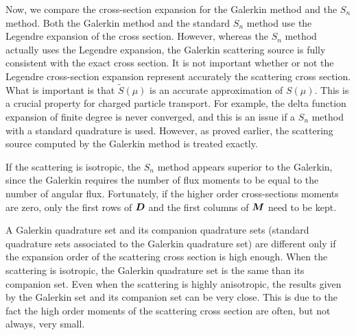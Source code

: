 Now, we compare the cross-section expansion for the Galerkin method and
the $S_n$ method. Both the Galerkin method and the standard $S_n$ method use
the Legendre expansion of the cross section. However, whereas the $S_n$ method
actually uses the Legendre expansion, the Galerkin scattering source is
fully consistent with the exact cross section. It is not
important whether or not the Legendre cross-section expansion represent
accurately the scattering cross section. What is important is that
$\tilde{S}(\mu)$ is an accurate approximation of $S(\mu)$. This is a crucial 
property for charged particle transport. For example, the delta
function expansion of finite degree is never converged, and this is an issue if a 
$S_n$ method with a standard quadrature is used. However, as proved earlier, 
the scattering source computed by the Galerkin method is treated exactly.

If the scattering is isotropic, the $S_n$ method appears superior to the
Galerkin, since the Galerkin requires the number of flux moments to be equal
to the number of angular flux. Fortunately, if the higher order cross-sections
moments are zero, only the first rows of $\boldsymbol{D}$ and the first columns of
$\boldsymbol{M}$ need to be kept.

A Galerkin quadrature set and its companion quadrature sets (standard
quadrature sets associated to the Galerkin quadrature set) are different only
if the expansion order of the scattering cross section is high enough. When the 
scattering is isotropic, the Galerkin quadrature set is the same than its
companion set. Even when the scattering is highly anisotropic, the results
given by the Galerkin set and its companion set can be very close. This is due
to the fact the high order moments of the scattering cross section are often,
but not always, very small.
